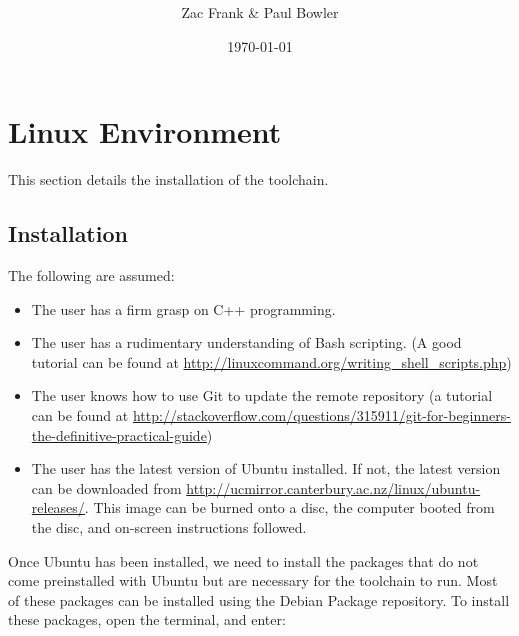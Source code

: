 \documentclass[a4paper, oneside, 11pt, titlepage, onecolumn, openright]{report}
\title{\projecttitle \\ \documenttitle}
\author{Zac Frank \& Paul Bowler}
\date{\today}
\begin{document}
	\maketitle
	
	\clearpage
	\tableofcontents

	


	\clearpage

\chapter{Linux Environment}
		\label{C:Environment}

		This section details the installation of the toolchain.
		\section{Installation }
			\label{s:Installation}
			The following are assumed:
			
\begin{itemize}
			\label{Requirements}
\item The user has a firm grasp on C++ programming.

\item The user has a rudimentary understanding of Bash scripting. (A good tutorial can be found at \url{http://linuxcommand.org/writing\_shell\_scripts.php})

\item The user knows how to use Git to update the remote repository (a tutorial can be found at \url{http://stackoverflow.com/questions/315911/git-for-beginners-the-definitive-practical-guide})

\item The user has the latest version of Ubuntu installed. If not, the latest version can be downloaded from \url{http://ucmirror.canterbury.ac.nz/linux/ubuntu-releases/}. This image can be burned onto a disc, the computer booted from the disc, and on-screen instructions followed.

\end{itemize}
			Once Ubuntu has been installed, we need to install the packages that do not come preinstalled with Ubuntu but are necessary for the toolchain to run. Most of these packages can be installed using the Debian Package repository. To install these packages, open the terminal, and enter:
			
\end{document}
